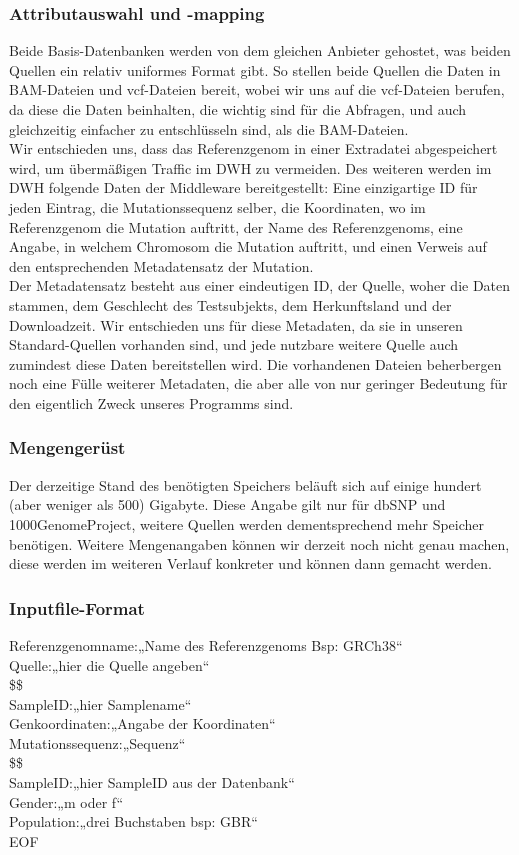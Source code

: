 \subsubsection{Attributauswahl und -mapping}
Beide Basis-Datenbanken werden von dem gleichen Anbieter gehostet, was beiden Quellen ein relativ uniformes Format gibt. So stellen beide Quellen die Daten in BAM-Dateien und vcf-Dateien bereit, wobei wir uns auf die vcf-Dateien berufen, da diese die Daten beinhalten, die wichtig sind für die Abfragen, und auch gleichzeitig einfacher zu entschlüsseln sind, als die BAM-Dateien.\\
Wir entschieden uns, dass das Referenzgenom in einer Extradatei abgespeichert wird, um übermäßigen Traffic im DWH zu vermeiden. Des weiteren werden im DWH folgende Daten der Middleware bereitgestellt: Eine einzigartige ID für jeden Eintrag, die Mutationssequenz selber, die Koordinaten, wo im Referenzgenom die Mutation auftritt, der Name des Referenzgenoms, eine Angabe, in welchem Chromosom die Mutation auftritt, und einen Verweis auf den entsprechenden Metadatensatz der Mutation.\\
Der Metadatensatz besteht aus einer eindeutigen ID, der Quelle, woher die Daten stammen, dem Geschlecht des Testsubjekts, dem Herkunftsland und der Downloadzeit. Wir entschieden uns für diese Metadaten, da sie in unseren Standard-Quellen vorhanden sind, und jede nutzbare weitere Quelle auch zumindest diese Daten bereitstellen wird. Die vorhandenen Dateien beherbergen noch eine Fülle weiterer Metadaten, die aber alle von nur geringer Bedeutung für den eigentlich Zweck unseres Programms sind. 
\subsubsection{Mengengerüst}
Der derzeitige Stand des benötigten Speichers beläuft sich auf einige hundert (aber weniger als 500) Gigabyte. Diese Angabe gilt nur für dbSNP und 1000GenomeProject, weitere Quellen werden dementsprechend mehr Speicher benötigen. Weitere Mengenangaben können wir derzeit noch nicht genau machen, diese werden im weiteren Verlauf konkreter und können dann gemacht werden.
\subsubsection{Inputfile-Format}
Referenzgenomname:„Name des Referenzgenoms Bsp: GRCh38“\\
Quelle:„hier die Quelle angeben“\\
\$\$\\
SampleID:„hier Samplename“\\
Genkoordinaten:„Angabe der Koordinaten“ \\
Mutationssequenz:„Sequenz“\\
\$\$\\
SampleID:„hier SampleID aus der Datenbank“\\
Gender:„m oder f“\\
Population:„drei Buchstaben bsp: GBR“ \\
EOF\\

